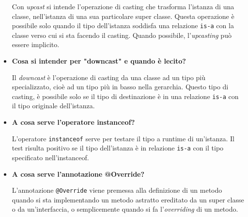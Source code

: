 \documentclass[12pt, a4paper]{article}
\begin{document}
\begin{itemize}
    Con \emph{upcast} si intende l'operazione di casting che trasforma l'istanza di
    una classe, nell'istanza di una sua particolare super classe. Questa operazione
    è possibile solo quando il tipo dell'istanza soddisfa una relazione \texttt{is-a}
    con la classe verso cui si sta facendo il casting. Quando possibile, l'\emph{upcasting}
    può essere implicito.

    \item \textbf{Cosa si intender per "downcast" e quando è lecito?}

    Il \emph{downcast} è l'operazione di casting da una classe ad un tipo più
    specializzato, cioè ad un tipo più in basso nella gerarchia. Questo tipo di
    casting, è possibile solo se il tipo di destinazione è in una relazione
    \texttt{is-a} con il tipo originale dell'istanza.

    \item \textbf{A cosa serve l'operatore instanceof?}

    L'operatore \texttt{instanceof} serve per testare il tipo a runtime di un'istanza.
    Il test risulta positivo se il tipo dell'istanza è in relazione \texttt{is-a}
    con il tipo specificato nell'instanceof.

    \item \textbf{A cosa serve l'annotazione @Override?}

    L'annotazione \texttt{@Override} viene premessa alla definizione di un metodo
    quando si sta implementando un metodo astratto ereditato da un super classe o
    da un'interfaccia, o semplicemente quando si fa l'\emph{overriding} di un metodo.
\end{itemize}
\end{document}
